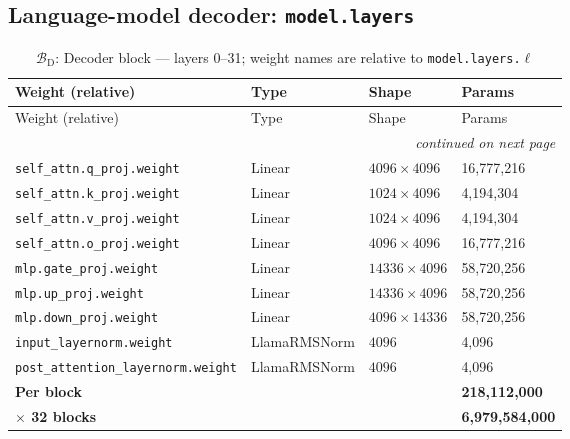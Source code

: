 \documentclass[10pt,a4paper]{article}
\theoremstyle{definition}
\begin{document}
\subsection{Language-model decoder: \texttt{model.layers}}
\begin{longtable}{p{6.6cm}>{\raggedright\arraybackslash}p{3.6cm}ll}
\caption{$\mathcal{B}_{\mathrm{D}}$: Decoder block --- layers 0--31; weight names are relative to \texttt{model.layers.$\ell$}}\\
\toprule
Weight (relative) & Type & Shape & Params \\
\midrule
\endfirsthead
\toprule
Weight (relative) & Type & Shape & Params \\
\midrule
\endhead
\midrule \multicolumn{4}{r}{\textit{continued on next page}} \\
\endfoot
\bottomrule
\endlastfoot
\texttt{self\_attn.\allowbreak{}q\_proj.\allowbreak{}weight} & Linear & $4096 \times 4096$ & 16,777,216 \\
\texttt{self\_attn.\allowbreak{}k\_proj.\allowbreak{}weight} & Linear & $1024 \times 4096$ & 4,194,304 \\
\texttt{self\_attn.\allowbreak{}v\_proj.\allowbreak{}weight} & Linear & $1024 \times 4096$ & 4,194,304 \\
\texttt{self\_attn.\allowbreak{}o\_proj.\allowbreak{}weight} & Linear & $4096 \times 4096$ & 16,777,216 \\
\texttt{mlp.\allowbreak{}gate\_proj.\allowbreak{}weight} & Linear & $14336 \times 4096$ & 58,720,256 \\
\texttt{mlp.\allowbreak{}up\_proj.\allowbreak{}weight} & Linear & $14336 \times 4096$ & 58,720,256 \\
\texttt{mlp.\allowbreak{}down\_proj.\allowbreak{}weight} & Linear & $4096 \times 14336$ & 58,720,256 \\
\texttt{input\_layernorm.\allowbreak{}weight} & Llama\allowbreak{}RMSNorm & $4096$ & 4,096 \\
\texttt{post\_attention\_layernorm.\allowbreak{}weight} & Llama\allowbreak{}RMSNorm & $4096$ & 4,096 \\
\midrule \textbf{Per block} & & & \textbf{218,112,000} \\
\textbf{$\times$ 32 blocks} & & & \textbf{6,979,584,000} \\
\end{longtable}
\end{document}
